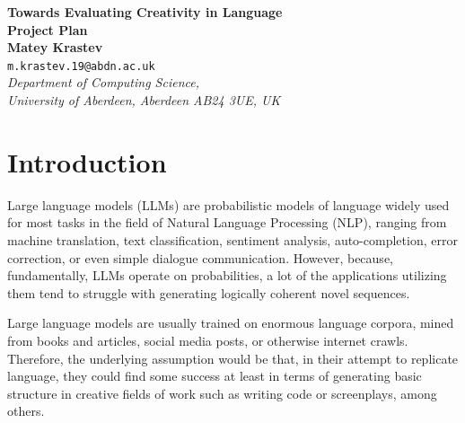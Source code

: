 \documentclass[a4paper,12pt]{article}
\newcommand{\ajs}[1]{\textcolor{orange}{[AJS: #1]}}
\begin{document}
\begin{center}
{\Large\bf{Towards Evaluating Creativity in Language}} \\
      \vspace{5.0mm}
{\Large\bf{Project Plan}} \\
      \vspace{8mm}
      {\large\bf{Matey Krastev}}  \\
      \vspace{5.0mm}
       {\tt m.krastev.19@abdn.ac.uk} \\
      \vspace{5.0mm}
      {\em Department of Computing Science,\\
       University of Aberdeen, Aberdeen AB24 3UE, UK} 
\end{center}


\section*{Introduction}

Large language models (LLMs) are probabilistic models of language widely used for most tasks in the field of Natural Language Processing (NLP), ranging from machine translation, text classification, sentiment analysis, auto-completion, error correction, or even simple dialogue communication. However, because, fundamentally, LLMs operate on probabilities, a lot of the applications utilizing them tend to struggle with generating logically coherent novel sequences. 

Large language models are usually trained on enormous language corpora, mined from books and articles\cite{gutenberg_dataset}, social media posts\cite{broad_twitter}, or otherwise internet crawls\cite{thepile_dataset}. Therefore, the underlying assumption would be that, in their attempt to replicate language, they could find some success at least in terms of generating basic structure in creative fields of work such as writing code\cite{codex_2021_copilot} or screenplays\cite{mirowski_co-writing_2022}, among others. 
\end{document}
